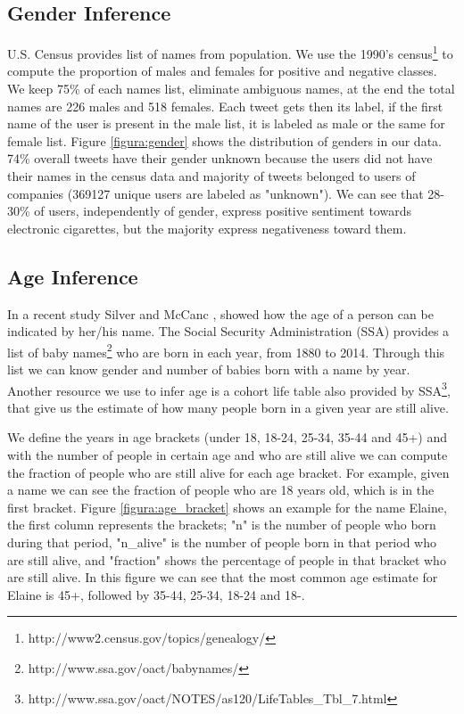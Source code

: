 \documentclass{sig-alternate}
\begin{document}
\subsection{Gender Inference}

U.S. Census provides list of names from population. We use the 1990's census\footnote{http://www2.census.gov/topics/genealogy/} to compute the proportion of males and females for positive and negative classes. We keep 75\% of each names list, eliminate ambiguous names, at the end the total names are 226 males and 518 females. Each tweet gets then its label, if the first name of the user is present in the male list, it is labeled as male or the same for female list. Figure \ref{figura:gender} shows the distribution of genders in our data. 74\% overall tweets have their gender unknown because the users did not have their names in the census data and majority of tweets belonged to users of companies (369127 unique users are labeled as "unknown"). We can see that 28-30\% of users, independently of gender, express positive sentiment towards electronic cigarettes, but the majority express negativeness toward them.


\subsection{Age Inference}

In a recent study Silver and McCanc \cite{silver2014how}, showed how the age of a person can be indicated by her/his name. The Social Security Administration (SSA) provides a list of baby names\footnote{http://www.ssa.gov/oact/babynames/} who are born in each year, from 1880 to 2014. Through this list we can know gender and number of babies born with a name by year. Another resource we use to infer age is a cohort life table also provided by SSA\footnote{http://www.ssa.gov/oact/NOTES/as120/LifeTables\_Tbl\_7.html}, that give us the estimate of how many people born in a given year are still alive. 

We define the years in age brackets (under 18, 18-24, 25-34, 35-44 and 45+) and with the number of people in certain age and who are still alive we can compute the fraction of people who are still alive for each age bracket. For example, given a name we can see the fraction of people who are 18 years old, which is in the first bracket. Figure \ref{figura:age_bracket} shows an example for the name Elaine, the first column represents the brackets; "n" is the number of people who born during that period, "n\_alive" is the number of people born in that period who are still alive, and "fraction" shows the percentage of people in that bracket who are still alive. In this figure we can see that the most common age estimate for Elaine is 45+, followed by 35-44, 25-34, 18-24 and 18-.
\end{document}
